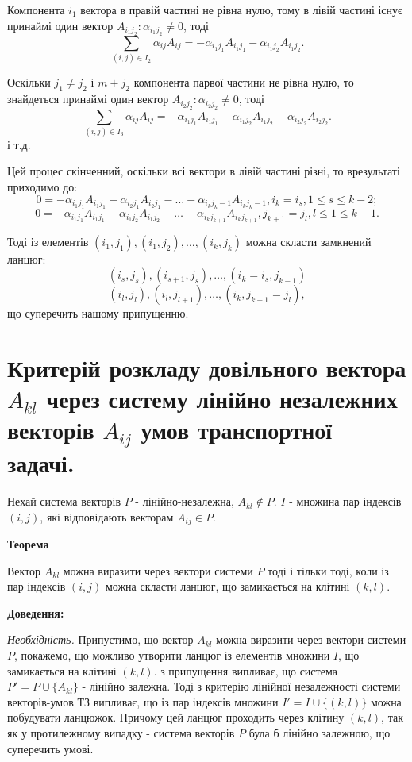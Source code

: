 \documentclass[12pt,a4paper]{report}
\begin{document}
Компонента $i_1$ вектора в правій частині не рівна нулю, тому в лівій частині існує принаймі один вектор $A_{{i_1}{j_2}}: \alpha_{{i_1}{j_2}}\neq0$, тоді 
\[ \sum_{(i,j) \in I_2}\alpha_{ij}A_{ij} = -\alpha_{{i_1}{j_1}}A_{{i_1}{j_1}}-\alpha_{{i_1}{j_2}}A_{{i_1}{j_2}}. \]

Оскільки $j_1 \neq j_2$ і $m + j_2$ компонента парвої частини не рівна нулю, то знайдеться принаймі один вектор $A_{{i_2}{j_2}}: \alpha_{{i_2}{j_2}} \neq 0$, тоді 
\[ \sum_{(i,j) \in I_3}\alpha_{ij}A_{ij} = -\alpha_{{i_1}{j_1}}A_{{i_1}{j_1}}-\alpha_{{i_1}{j_2}}A_{{i_1}{j_2}}-\alpha_{{i_2}{j_2}}A_{{i_2}{j_2}}. \]
і т.д.

Цей процес скінченний, оскільки всі вектори в лівій частині різні, то врезультаті приходимо до:
\[ 0 = -\alpha_{{i_1}{j_1}}A_{{i_1}{j_1}}-\alpha_{{i_2}{j_1}}A_{{i_2}{j_1}}-\dots-\alpha_{{i_k}{j_k-1}}A_{{i_k}{j_k-1}}, i_k=i_s, 1 \leq s \leq k-2; \]
\[ 0 = -\alpha_{{i_1}{j_1}}A_{{i_1}{j_1}}-\alpha_{{i_1}{j_2}}A_{{i_1}{j_2}}-\dots-\alpha_{{i_k}{j_{k+1}}}A_{{i_k}{j_{k+1}}}, j_{k+1}=j_l, l \leq 1 \leq k-1. \]

Тоді із елементів $(i_1,j_1), (i_1,j_2), \dots, (i_k,j_k)$ можна скласти замкнений ланцюг:
\[ (i_s,j_s), (i_{s+1},j_s), \dots, (i_k = i_s, j_{k-1}) \]
\[ (i_l,j_l), (i_l,j_{l+1}), \dots, (i_k, j_{k+1} = j_l), \]
що суперечить нашому припущенню.

\clearpage

\chapter{Критерій розкладу довільного вектора $A_{kl}$ через систему лінійно незалежних векторів $A_{ij}$ умов транспортної задачі.}

Нехай система векторів $P$ - лінійно-незалежна, $A_{kl} \notin P$. $I$ - множина пар індексів $(i,j)$, які відповідають векторам $A_{ij} \in P$.

{\bf Теорема}

Вектор $A_{kl}$ можна виразити через вектори системи $P$ тоді і тільки тоді, коли із пар індексів $(i,j)$ можна скласти ланцюг, що замикається на клітині $(k,l)$.

{\bf Доведення:}

{\it Необхідність.} Припустимо, що вектор $A_{kl}$ можна виразити через вектори системи $P$, покажемо, що можливо утворити ланцюг із елементів множини $I$, що замикається на клітині $(k,l)$. з припущення випливає, що система $P'=P \cup \{A_{kl}\}$ - лінійно залежна. Тоді з критерію лінійної незалежності системи векторів-умов ТЗ випливає, що із пар індексів множини $I'=I \cup \{(k,l)\}$ можна побудувати ланцюжок. Причому цей ланцюг проходить через клітину $(k,l)$, так як у протилежному випадку - система векторів $P$ була б лінійно залежною, що суперечить умові.
\end{document}
